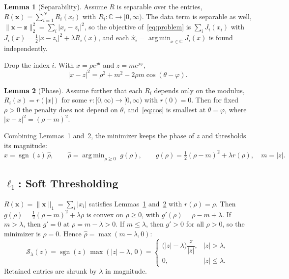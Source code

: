 \documentclass[11pt,a4paper]{article}
\theoremstyle{definition}
\newtheorem{lemma}{Lemma}
\newcommand{\C}{\mathbb{C}}
\DeclareMathOperator*{\argmin}{arg\,min}
\DeclareMathOperator{\sgn}{sgn}
\begin{document}
\begin{lemma}[Separability]\label{lem:sep}
Assume $R$ is separable over the entries, $R(\mathbf x) = \sum_{i=1}^N R_i(x_i)$ with
$R_i:\C\to[0,\infty)$. The data term is separable as well,
$\lVert\mathbf x-\mathbf z\rVert_2^2 = \sum_i|x_i-z_i|^2$, so the objective of~\eqref{eq:problem}
is $\sum_i J_i(x_i)$ with $J_i(x) = \tfrac12|x-z_i|^2 + \lambda R_i(x)$, and each
$\hat x_i = \argmin_{x\in\C} J_i(x)$ is found independently.
\end{lemma}

Drop the index $i$. With $x=\rho e^{j\theta}$ and $z = m e^{j\varphi}$,
\begin{equation}\label{eq:cos}
  |x - z|^2 = \rho^2 + m^2 - 2\rho m\cos(\theta-\varphi).
\end{equation}

\begin{lemma}[Phase]\label{lem:phase}
Assume further that each $R_i$ depends only on the modulus, $R_i(x) = r(|x|)$ for some
$r:[0,\infty)\to[0,\infty)$ with $r(0)=0$. Then for fixed $\rho>0$ the penalty does not depend
on $\theta$, and~\eqref{eq:cos} is smallest at $\theta=\varphi$, where $|x-z|^2 = (\rho-m)^2$.
\end{lemma}

Combining Lemmas~\ref{lem:sep} and~\ref{lem:phase}, the minimizer keeps the phase of $z$ and
thresholds its magnitude:
\begin{equation}\label{eq:mag}
  \hat x = \sgn(z)\,\hat\rho,\qquad
  \hat\rho = \argmin_{\rho\ge 0}\; g(\rho),\qquad
  g(\rho) = \tfrac12(\rho - m)^2 + \lambda r(\rho),\quad m = |z| .
\end{equation}

\subsection{\texorpdfstring{$\ell_1$}{L1}: Soft Thresholding}

$R(\mathbf x) = \lVert\mathbf x\rVert_1 = \sum_i |x_i|$ satisfies Lemmas~\ref{lem:sep} and~\ref{lem:phase} with $r(\rho) = \rho$.
Then $g(\rho) = \tfrac12(\rho-m)^2 + \lambda\rho$ is convex on $\rho\ge0$, with
$g'(\rho) = \rho - m + \lambda$.
If $m>\lambda$, then $g'=0$ at $\rho = m-\lambda>0$.
If $m\le\lambda$, then $g'>0$ for all $\rho>0$, so the minimizer is $\rho=0$.
Hence $\hat\rho = \max(m-\lambda,0)$:
\begin{equation}\label{eq:soft}
  \mathcal S_\lambda(z) = \sgn(z)\,\max(|z|-\lambda,\,0)
  = \begin{cases} \bigl(|z|-\lambda\bigr)\dfrac{z}{|z|}, & |z|>\lambda,\\[1ex] 0, & |z|\le\lambda.\end{cases}
\end{equation}
Retained entries are shrunk by $\lambda$ in magnitude.
\end{document}
